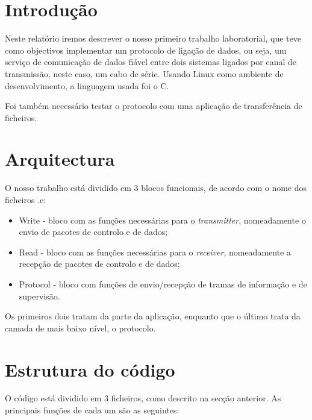 \documentclass[a4paper,11pt]{article}
\begin{document}

\newpage

\setcounter{page}{1}

\section{Introdução}
Neste relatório iremos descrever o nosso primeiro trabalho laboratorial, que teve como objectivos implementar um protocolo de ligação de dados, ou seja, um serviço de comunicação de dados fiável entre dois sistemas ligados 
por canal de transmissão, neste caso, um cabo de série. Usando Linux como ambiente de desenvolvimento, a linguagem usada foi o C. 

Foi também necessário testar o protocolo com uma aplicação de transferência de ficheiros.

\section{Arquitectura}
O nosso trabalho está dividido em 3 blocos funcionais, de acordo com o nome dos ficheiros .c: 
\begin{itemize}
\item Write - bloco com as funções necessárias para o \textit{transmitter}, nomeadamente o envio de pacotes de controlo e de dados;
\item Read - bloco com as funções necessárias para o \textit{receiver}, nomeadamente a recepção de pacotes de controlo e de dados;
\item Protocol - bloco com funções de envio/recepção de tramas de informação e de supervisão.
\end{itemize}

Os primeiros dois tratam da parte da aplicação, enquanto que o último trata da camada de mais baixo nível, o protocolo.

\section{Estrutura do código}
O código está dividido em 3 ficheiros, como descrito na secção anterior. As principais funções de cada um são as seguintes:
\lstset{language=C,
		showstringspaces=false,
		frame=tb,
		caption=Read.h}
		
\end{document}
